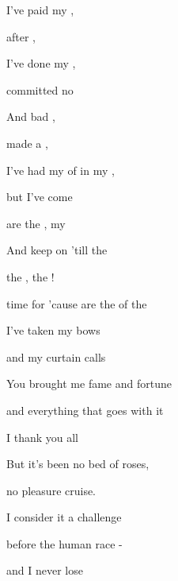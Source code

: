 

\zs
I've paid my ,

 after ,

I've done my ,

 committed no  

And bad ,

 made a , 

I've had my  of   in my ,

but {I've} come  
\ks

\zr
{} are the , my   

And  keep on  'till the  

 the ,  the !

 time for  'cause  are the  of the  
\kr

\zs
I've taken my bows

and my curtain calls

You brought me fame and fortune

and everything that goes with it

I thank you all

But it's been no bed of roses,

no pleasure cruise.

I consider it a challenge

before the human race -

and I never lose
\ks

\zr  \kr

\kp






















